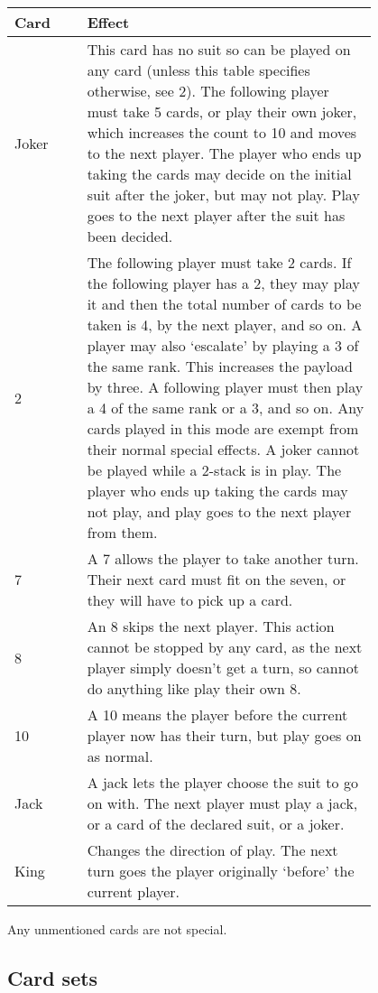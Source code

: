 \documentclass{article}
\begin{document}
    \begin{center}
    {
    \renewcommand{\arraystretch}{2.0}
    \begin{tabular}{lp{0.8\linewidth}} \toprule
    Card & Effect \\ \midrule
    Joker &
    This card has no suit so can be played on any card (unless this table
    specifies otherwise, see 2). The following player must take 5 cards, or
    play their own joker, which increases the count to 10 and moves to the next
    player. The player who ends up taking the cards may decide on the initial
    suit after the joker, but may not play. Play goes to the next player after
    the suit has been decided.
    \\ 2 &
    The following player must take 2 cards. If the following player has a 2,
    they may play it and then the total number of cards to be taken is 4, by
    the next player, and so on. A player may also `escalate' by playing a 3 of
    the same rank. This increases the payload by three. A following player must
    then play a 4 of the same rank or a 3, and so on. Any cards played in this
    mode are exempt from their normal special effects. A joker cannot be played
    while a 2-stack is in play. The player who ends up taking the cards may not
    play, and play goes to the next player from them.
    \\ 7 &
    A 7 allows the player to take another turn. Their next card must fit on
    the seven, or they will have to pick up a card.
    \\ 8 &
    An 8 skips the next player. This action cannot be stopped by any card,
    as the next player simply doesn't get a turn, so cannot do anything like
    play their own 8.
    \\ 10 &
    A 10 means the player before the current player now has their turn, but
    play goes on as normal.
    \\ Jack &
    A jack lets the player choose the suit to go on with. The next player must
    play a jack, or a card of the declared suit, or a joker.
    \\ King &
    Changes the direction of play. The next turn goes the player originally
    `before' the current player.
    \\ \bottomrule
    \end{tabular}
    }
    \end{center}

    Any unmentioned cards are not special.

    \subsection{Card sets}
\end{document}
